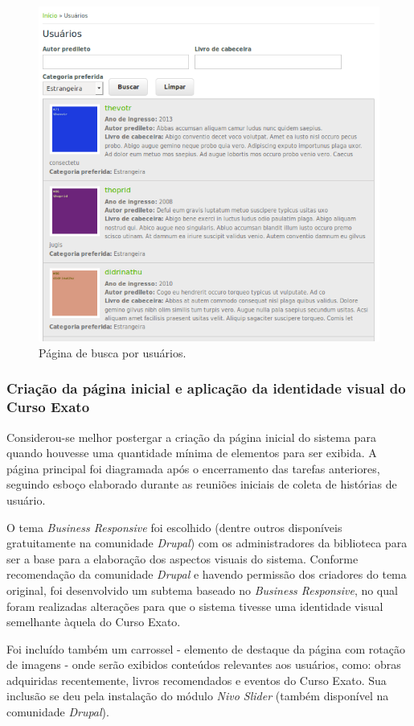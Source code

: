 \documentclass[a4paper]{article}
\begin{document}
\begin{figure}[pbth!]
\centering
\includegraphics[width=120mm]{img/users.png}
\caption{Página de busca por usuários.\label{users}}
\end{figure}


\subsubsection{Criação da página inicial e aplicação da identidade visual do Curso Exato}

Considerou-se melhor postergar a criação da página inicial do sistema para quando houvesse uma quantidade mínima de elementos para ser exibida. A página principal foi diagramada após o encerramento das tarefas anteriores, seguindo esboço elaborado durante as reuniões iniciais de coleta de histórias de usuário.

O tema \textit{Business Responsive} foi escolhido (dentre outros disponíveis gratuitamente na comunidade \textit{Drupal}) com os administradores da biblioteca para ser a base para a elaboração dos aspectos visuais do sistema. Conforme recomendação da comunidade \textit{Drupal} e havendo permissão dos criadores do tema original, foi desenvolvido um subtema baseado no \textit{Business Responsive}, no qual foram realizadas alterações para que o sistema tivesse uma identidade visual semelhante àquela do Curso Exato.

Foi incluído também um carrossel - elemento de destaque da página com rotação de imagens - onde serão exibidos conteúdos relevantes aos usuários, como: obras adquiridas recentemente, livros recomendados e eventos do Curso Exato. Sua inclusão se deu pela instalação do módulo \textit{Nivo Slider} (também disponível na comunidade \textit{Drupal}).
\end{document}
